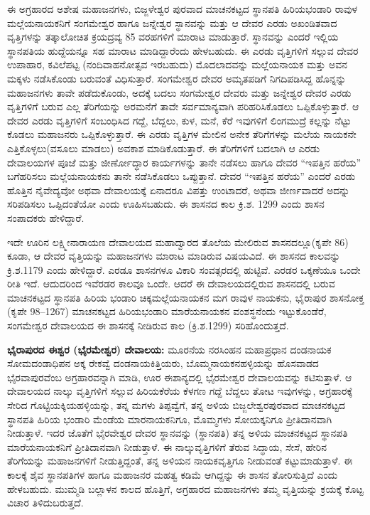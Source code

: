 ಈ ಅಗ್ರಹಾರದ ಅಶೇಷ ಮಹಾಜನಗಳು, ಬಿಜ್ಜಳೇಶ್ವರ ಪುರವಾದ ಮಾಚನಕಟ್ಟದ ಸ್ಥಾನಪತಿ ಹಿರಿಯಭಂಡಾರಿ ರಾವುಳ ಮಲ್ಲೆಯನಾಯಕನಿಗೆ ಸಂಗಮೇಶ್ವರ ಹಾಗೂ ಜನ್ನೇಶ್ವರ ಸ್ಥಾನವನ್ನು ಮತ್ತು ಆ ದೇವರ ಎರಡು ಅಖಂಡಿತವಾದ ವೃತ್ತಿಗಳನ್ನು ತತ್ಕಾಲೋಚಿತ ಕ್ರಯದ್ರವ್ಯ 85 ವರಹಗಳಿಗೆ ಮಾರಾಟ ಮಾಡುತ್ತಾರೆ. ಸ್ಥಾನವನ್ನು ಎಂದರೆ ಇಲ್ಲಿಯ ಸ್ಥಾನಪತಿಯ ಹುದ್ದೆಯನ್ನೂ ಸಹ ಮಾರಾಟ ಮಾಡಿದ್ದಾರೆಂದು ಹೇಳಬಹುದು. ಈ ಎರಡು ವೃತ್ತಿಗಳಿಗೆ ಸಲ್ಲುವ ದೇವರ ಉಪಾಹಾರ, ಕವಿಲೆಪಟ್ಟ (ನಂದಿವಾಹನೋತ್ಸವ ಇರಬಹುದು) ಮೊದಲಾದವನ್ನು ಮಲ್ಲೆಯನಾಯಕ ಮತ್ತು ಅವನ ಮಕ್ಕಳು ನಡೆಸಿಕೊಂಡು ಬರುವಂತೆ ವಿಧಿಸುತ್ತಾರೆ. ಸಂಗಮೇಶ್ವರ ದೇವರ ಅಮೃತಪಡಿಗೆ ನಿಗದಿಪಡಿಸಿದ್ದ ಹೊನ್ನನ್ನು ಮಹಾಜನಗಳು ತಾವೇ ಪಡೆದುಕೊಂಡು, ಅದಕ್ಕೆ ಬದಲು ಸಂಗಮೇಶ್ವರ ದೇವರು ಮತ್ತು ಜನ್ನೇಶ್ವರ ದೇವರ ಎರಡು ವೃತ್ತಿಗಳಿಗೆ ಬರುವ ಎಲ್ಲ ತೆರಿಗೆಯನ್ನು ಅರಮನೆಗೆ ತಾವೇ ಸರ್ವಮಾನ್ಯವಾಗಿ ಪರಿಹರಿಸಿಕೊಡಲು ಒಪ್ಪಿಕೊಳ್ಳುತ್ತಾರೆ. ಆ ದೇವರ ಎರಡು ವೃತ್ತಿಗಳಿಗೆ ಸಂಬಂಧಿಸಿದ ಗದ್ದೆ, ಬೆದ್ದಲು, ಕುಳ, ಮನೆ, ಕೆರೆ ಇವುಗಳಿಗೆ ಲಿಂಗಮುದ್ರೆ ಕಲ್ಲನ್ನು ನೆಟ್ಟು ಕೊಡಲು ಮಹಾಜನರು ಒಪ್ಪಿಕೊಳ್ಳುತ್ತಾರೆ. ಈ ಎರಡು ವೃತ್ತಿಗಳ ಮೇಲಿನ ಅನೇಕ ತೆರಿಗೆಗಳನ್ನು ಮಲೆಯ ನಾಯಕನೇ ಎತ್ತಿಕೊಳ್ಳಲು(ವಸೂಲು ಮಾಡಲು) ಅವಕಾಶ ಮಾಡಿಕೊಡುತ್ತಾರೆ. ಈ ತೆರಿಗೆಗಳಿಗೆ ಬದಲಾಗಿ ಆ ಎರಡು ದೇವಾಲಯಗಳ ಪೂಜೆ ಮತ್ತು ಜೀರ್ಣೋದ್ಧಾರ ಕಾರ್ಯಗಳನ್ನು ತಾನೇ ನಡೆಸಲು ಹಾಗೂ ದೇವರ “ಇಪತ್ತಿನ ಹರೆಯ” ಬಗೆಹರಿಸಲು ಮಲ್ಲೆಯನಾಯಕನು ತಾನೇ ನಡೆಸಿಕೊಡಲು ಒಪ್ಪುತ್ತಾನೆ. ದೇವರ “ಇಪತ್ತಿನ ಹರೆಯ” ಎಂದರೆ ಎರಡು ಹೊತ್ತಿನ ನೈವೇದ್ಯವೋ ಅಥವಾ ದೇವಾಲಯಕ್ಕೆ ಏನಾದರೂ ವಿಪತ್ತು ಉಂಟಾದರೆ, ಅಥವಾ ಜೀರ್ಣವಾದರೆ ಅದನ್ನು ಸರಿಪಡಿಸಲು ಒಪ್ಪಿದಂತೆಯೋ ಎಂದು ಊಹಿಸಬಹುದು. ಈ ಶಾಸನದ ಕಾಲ ಕ್ರಿ.ಶ. 1299 ಎಂದು ಶಾಸನ ಸಂಪಾದಕರು ಹೇಳಿದ್ದಾರೆ.

ಇದೇ ಊರಿನ ಲಕ್ಷ್ಮೀನಾರಾಯಣ ದೇವಾಲಯದ ಮಹಾದ್ವಾರದ ತೊಲೆಯ ಮೇಲಿರುವ ಶಾಸನದಲ್ಲೂ(ಕೃಪೇ 86) ಕೂಡಾ, ಆ ದೇವರ ವೃತ್ತಿಯನ್ನು ಮಹಾಜನಗಳು ಮಾರಾಟ ಮಾಡಿರುವ ವಿಷಯವಿದೆ. ಈ ಶಾಸನದ ಕಾಲವನ್ನು ಕ್ರಿ.ಶ.1179 ಎಂದು ಹೇಳಿದ್ದಾರೆ. ಎರಡೂ ಶಾಸನಗಳೂ ವಿಕಾರಿ ಸಂವತ್ಸರದಲ್ಲಿ ಹುಟ್ಟಿವೆ. ಎರಡರ ಒಕ್ಕಣೆಯೂ ಒಂದೇ ರೀತಿ ಇದೆ. ಆದುದರಿಂದ ಇವೆರಡರ ಕಾಲವೂ ಒಂದೇ. ಆದರೆ ಈ ದೇವಾಲಯದಲ್ಲಿರುವ ಶಾಸನದಲ್ಲಿ ಬರುವ ಮಾಚನಕಟ್ಟದ ಸ್ಥಾನಪತಿ ಹಿರಿಯ ಭಂಡಾರಿ ಚಿಕ್ಕಮಲ್ಲೆಯನಾಯಕನ ಮಗ ರಾವುಳ ನಾಯಕನು, ಭೈರಾಪುರ ಶಾಸನೋಕ್ತ (ಕೃಪೇ 98–1267) ಮಾಚನಕಟ್ಟದ ಹಿರಿಯಭಂಡಾರಿ ಮಾರೆಯನಾಯಕನ ವಂಶಸ್ಥನೆಂದು ಇಟ್ಟುಕೊಂಡೆರೆ, ಸಂಗಮೇಶ್ವರ ದೇವಾಲಯದ ಈ ಶಾಸನಕ್ಕೆ ನೀಡಿರುವ ಕಾಲ (ಕ್ರಿ.ಶ.1299) ಸರಿಹೊಂದುತ್ತದೆ.

\textbf{ಭೈರಾಪುರದ ಈಶ್ವರ (ಭೈರಮೇಶ್ವರ) ದೇವಾಲಯ:} ಮೂರನೆಯ ನರಸಿಂಹನ ಮಹಾಪ್ರಧಾನ ದಂಡನಾಯಕ ಸೋಮದಂಡಾಧಿಪನ ಅಕ್ಕ ರೇಕವ್ವೆ ದಂಡನಾಯಕಿತ್ತಿಯರು, ಬೊಮ್ಮನಾಯಕನಹಳ್ಳಿಯನ್ನು ಹೊಸವಾಡದ ಭೈರವಾಪುರವೆಂಬ ಅಗ್ರಹಾರವನ್ನಾಗಿ ಮಾಡಿ, ಊರ ಈಶಾನ್ಯದಲ್ಲಿ ಭೈರಮೇಶ್ವರ ದೇವಾಲಯವನ್ನು ಕಟಿಸುತ್ತಾಳೆ. ಆ ದೇವಾಲಯದ ನಾಲ್ಕು ವೃತ್ತಿಗಳಿಗೆ ಸಲ್ಲುವ ಹಿರಿಯಕೆರೆಯ ಕೆಳಗಣ ಗದ್ದೆ ಬೆದ್ದಲು ತೋಟ ಇವುಗಳನ್ನು, ಅಗ್ರಹಾರಕ್ಕೆ ಸೇರಿದ ಗೊಟ್ಟಿಯಕ್ಕಿಯಹಳ್ಳಿಯನ್ನು, ತನ್ನ ಮಗಳು ತಿಪ್ಪವ್ವೆಗೆ, ತನ್ನ ಅಳಿಯ ಬಿಜ್ಜಲೇಶ್ವರಪುರವಾದ ಮಾಚನಕಟ್ಟದ ಸ್ಥಾನಪತಿ ಹಿರಿಯ ಭಂಡಾರಿ ಮೆಂಡೆಯ ಮಾರನಾಯಕನಿಗೂ, ಮೊಮ್ಮಗಳು ಸೋಯಕ್ಕನಿಗೂ ಪ್ರೀತಿದಾನವಾಗಿ ನೀಡುತ್ತಾಳೆ. ಇದರ ಜೊತೆಗೆ ಭೈರವೇಶ್ವರ ದೇವರ ಸ್ಥಾನವನ್ನು (ಸ್ಥಾನಪತಿ) ತನ್ನ ಅಳಿಯ ಮಾಚನಕಟ್ಟದ ಸ್ಥಾನಪತಿ ಮಾರೆಯನಾಯಕನಿಗೆ ಪ್ರೀತಿದಾನವಾಗಿ ನೀಡುತ್ತಾಳೆ. ಈ ನಾಲ್ಕುವೃತ್ತಿಗಳಿಗೆ ತೆರುವ ಸಿದ್ಧಾಯ, ಸೇಸೆ, ಹೇರಿನ ತೆರಿಗೆಯನ್ನು ಮಹಾಜನಗಳಿಗೆ ನೀಡುತ್ತಿದ್ದಂತೆ, ತನ್ನ ಅಳಿಯನ ನಾಯಕವೃತ್ತಿಗೂ ನೀಡುವಂತೆ ಕಟ್ಟುಮಾಡುತ್ತಾಳೆ. ಈ ಕಾಲಕ್ಕೆ ಶೈವ ಸ್ಥಾನಪತಿಗಳ ಹಾಗೂ ಮಹಾಜನರ ಮಹತ್ವ ಕಡಿಮೆ ಆಗಿದ್ದನ್ನು ಈ ಶಾಸನ ತೋರಿಸುತ್ತಿದೆ ಎಂದು ಹೇಳಬಹುದು. ಮುಮ್ಮಡಿ ಬಲ್ಲಾಳನ ಕಾಲದ ಹೊತ್ತಿಗೆ, ಅಗ್ರಹಾರದ ಮಹಾಜನಗಳು ತಮ್ಮ ವೃತ್ತಿಯನ್ನು ಕ್ರಯಕ್ಕೆ ಕೊಟ್ಟ ವಿಚಾರ ತಿಳಿದುಬರುತ್ತದೆ.


